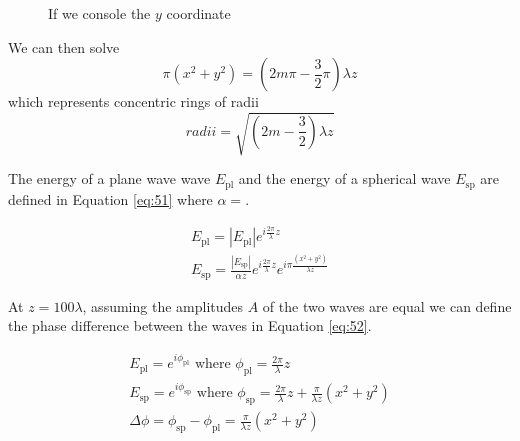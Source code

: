 \documentclass[main.tex]{subfiles}
\begin{document}
\begin{enumerate}
\begin{enumerate}
\begin{figure}
\centering{}
\caption{If we console the $y$ coordinate}
\label{fig:51a02}
\end{figure}

We can then solve 
$$\pi (x^2 + y^2) = (2m\pi - \frac{3}{2}\pi)\lambda z$$
which represents concentric rings of radii
$$radii = \sqrt{(2m - \frac{3}{2}) \lambda z}$$

The energy of a plane wave wave $E_{\mathrm{pl}}$ and the energy of a spherical wave $E_{\mathrm{sp}}$ are defined in Equation \ref{eq:51} where $\alpha = $.

\begin{equation}\label{eq:51}
\begin{array}{l}
{E_{\mathrm{pl}}=\left|E_{\mathrm{pl}}\right| e^{i \frac{2 \pi}{\lambda} z}} \\
{E_{\mathrm{sp}}=\frac{\left|E_{\mathrm{sp}}\right|}{\alpha z} e^{i \frac{2 \pi}{\lambda} z} e^{i \pi \frac{\left(x^{2}+y^{2}\right)}{\lambda z}}}
\end{array}
\end{equation}


At $z=100\lambda$, assuming the amplitudes $A$ of the two waves are equal we can define the phase difference between the waves in Equation \ref{eq:52}. 

\begin{equation}\label{eq:52}
\begin{array}{l}
{E_{\mathrm{pl}}=e^{i \phi_{\mathrm{pl}}} \text { where } \phi_{\mathrm{pl}}=\frac{2 \pi}{\lambda} z} \\ 
{E_{\mathrm{sp}}=e^{i \phi_{\mathrm{sp}}} \text { where } \phi_{\mathrm{sp}}=\frac{2 \pi}{\lambda} z+\frac{\pi}{\lambda z}\left(x^{2}+y^{2}\right)} \\ 
{\Delta \phi=\phi_{\mathrm{sp}}-\phi_{\mathrm{pl}}=\frac{\pi}{\lambda z}\left(x^{2}+y^{2}\right)}\end{array}
\end{equation}


\end{enumerate}
\end{enumerate}
\end{document}
